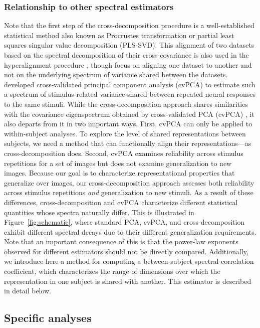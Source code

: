 \documentclass[10pt]{article}
\begin{document}
\subsubsection{Relationship to other spectral estimators}\label{sec:comparison-with-other-estimators}

Note that the first step of the cross-decomposition procedure is a well-established statistical method also known as Procrustes transformation or partial least squares singular value decomposition (PLS-SVD). This alignment of two datasets based on the spectral decomposition of their cross-covariance is also used in the hyperalignment procedure \autocite{Haxby2011}, though \textcite{Haxby2011} focus on aligning one dataset to another and not on the underlying spectrum of variance shared between the datasets. \textcite{Stringer2019} developed cross-validated principal component analysis (cvPCA) to estimate such a spectrum of stimulus-related variance shared between repeated neural responses to the same stimuli. While the cross-decomposition approach shares similarities with the covariance eigenspectrum obtained by cross-validated PCA (cvPCA) \autocite{Stringer2019}, it also departs from it in two important ways. First, cvPCA can only be applied to within-subject analyses. To explore the level of shared representations between subjects, we need a method that can functionally align their representations---as cross-decomposition does. Second, cvPCA examines reliability across stimulus repetitions for a set of images but does not examine generalization to new images. Because our goal is to characterize representational properties that generalize over images, our cross-decomposition approach assesses both reliability across stimulus repetitions \emph{and} generalization to new stimuli. As a result of these differences, cross-decomposition and cvPCA characterize different statistical quantities whose spectra naturally differ. This is illustrated in Figure~\ref{fig:schematic}, where standard PCA, cvPCA, and cross-decomposition exhibit different spectral decays due to their different generalization requirements. Note that an important consequence of this is that the power-law exponents observed for different estimators should not be directly compared. Additionally, we introduce here a method for computing a between-subject spectral correlation coefficient, which characterizes the range of dimensions over which the representation in one subject is shared with another. This estimator is described in detail below.

\subsection{Specific analyses}\label{specific-analyses}
\end{document}
